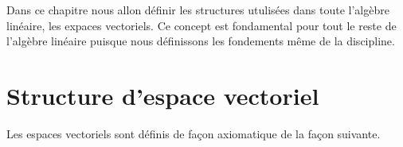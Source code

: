 
\minitoc  %

Dans ce chapitre nous allon définir les structures utulisées dans toute l'algèbre linéaire, les expaces vectoriels. 
Ce concept est fondamental pour tout le reste de l'algèbre linéaire puisque nous définissons les 
fondements même de la discipline. 


\section{Structure d'espace vectoriel}

Les espaces vectoriels sont définis de façon axiomatique de la façon suivante.

